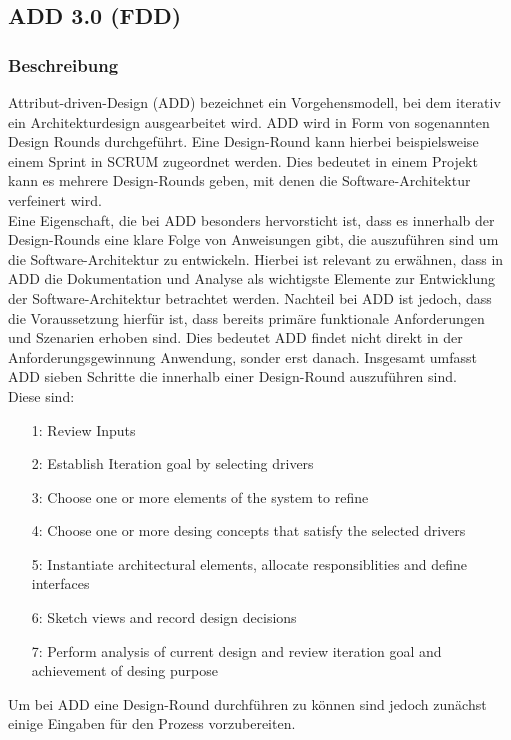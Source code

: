 \subsection{ADD 3.0 (FDD)}\label{add3}
\subsubsection{Beschreibung}
Attribut-driven-Design (ADD) bezeichnet ein Vorgehensmodell, bei dem iterativ ein Architekturdesign ausgearbeitet wird. ADD wird in Form von sogenannten Design Rounds durchgeführt. Eine Design-Round kann hierbei beispielsweise einem Sprint in SCRUM zugeordnet werden. Dies bedeutet in einem Projekt kann es mehrere Design-Rounds geben, mit denen die Software-Architektur verfeinert wird. \\

Eine Eigenschaft, die bei ADD besonders hervorsticht ist, dass es innerhalb der Design-Rounds eine klare Folge von Anweisungen gibt, die auszuführen sind um die Software-Architektur zu entwickeln. Hierbei ist relevant zu erwähnen, dass in ADD die Dokumentation und Analyse als wichtigste Elemente zur Entwicklung der Software-Architektur betrachtet werden. Nachteil bei ADD ist jedoch, dass die Voraussetzung hierfür ist, dass bereits primäre funktionale Anforderungen und Szenarien erhoben sind. Dies bedeutet ADD findet nicht direkt in der Anforderungsgewinnung Anwendung, sonder erst danach. Insgesamt umfasst ADD sieben Schritte die innerhalb einer Design-Round auszuführen sind.\\

Diese sind:
\begin{itemize}
\item[1:] Review Inputs
\item[2:] Establish Iteration goal by selecting drivers
\item[3:] Choose one or more elements of the system to refine
\item[4:] Choose one or more desing concepts that satisfy the selected drivers
\item[5:] Instantiate architectural elements, allocate responsiblities and define interfaces
\item[6:] Sketch views and record design decisions
\item[7:] Perform analysis of current design and review iteration goal and achievement of desing purpose
\end{itemize}
Um bei ADD eine Design-Round durchführen zu können sind jedoch zunächst einige Eingaben für den Prozess vorzubereiten.\\

